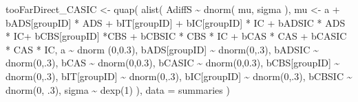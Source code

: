 \documentclass[
  10pt,
  dvipsnames,enabledeprecatedfontcommands]{scrartcl}
\newenvironment{Shaded}{\begin{snugshade}}{\end{snugshade}}
\newcommand{\AttributeTok}[1]{\textcolor[rgb]{0.77,0.63,0.00}{#1}}
\newcommand{\DecValTok}[1]{\textcolor[rgb]{0.00,0.00,0.81}{#1}}
\newcommand{\FloatTok}[1]{\textcolor[rgb]{0.00,0.00,0.81}{#1}}
\newcommand{\FunctionTok}[1]{\textcolor[rgb]{0.00,0.00,0.00}{#1}}
\newcommand{\NormalTok}[1]{#1}
\newcommand{\OtherTok}[1]{\textcolor[rgb]{0.56,0.35,0.01}{#1}}
\newcommand{\SpecialCharTok}[1]{\textcolor[rgb]{0.00,0.00,0.00}{#1}}
\begin{document}
\begin{Shaded}
\begin{Highlighting}[]
\NormalTok{tooFarDirect\_CASIC }\OtherTok{\textless{}{-}} \FunctionTok{quap}\NormalTok{(}
  \FunctionTok{alist}\NormalTok{(}
\NormalTok{    AdiffS }\SpecialCharTok{\textasciitilde{}} \FunctionTok{dnorm}\NormalTok{( mu, sigma ),}
\NormalTok{    mu }\OtherTok{\textless{}{-}}\NormalTok{ a }\SpecialCharTok{+}\NormalTok{ bADS[groupID] }\SpecialCharTok{*}\NormalTok{ ADS }\SpecialCharTok{+}\NormalTok{  bIT[groupID] }\SpecialCharTok{+}\NormalTok{ bIC[groupID] }\SpecialCharTok{*}\NormalTok{ IC }\SpecialCharTok{+} 
\NormalTok{      bADSIC }\SpecialCharTok{*}\NormalTok{ ADS }\SpecialCharTok{*}\NormalTok{ IC}\SpecialCharTok{+}\NormalTok{ bCBS[groupID] }\SpecialCharTok{*}\NormalTok{CBS }\SpecialCharTok{+}\NormalTok{ bCBSIC }\SpecialCharTok{*}\NormalTok{ CBS }\SpecialCharTok{*}\NormalTok{ IC }\SpecialCharTok{+}\NormalTok{ bCAS }\SpecialCharTok{*}\NormalTok{ CAS }\SpecialCharTok{+}\NormalTok{ bCASIC }\SpecialCharTok{*}\NormalTok{ CAS }\SpecialCharTok{*}\NormalTok{ IC, }
\NormalTok{    a }\SpecialCharTok{\textasciitilde{}} \FunctionTok{dnorm}\NormalTok{ (}\DecValTok{0}\NormalTok{,}\FloatTok{0.3}\NormalTok{),}
\NormalTok{    bADS[groupID] }\SpecialCharTok{\textasciitilde{}} \FunctionTok{dnorm}\NormalTok{(}\DecValTok{0}\NormalTok{,.}\DecValTok{3}\NormalTok{),}
\NormalTok{    bADSIC }\SpecialCharTok{\textasciitilde{}} \FunctionTok{dnorm}\NormalTok{(}\DecValTok{0}\NormalTok{,.}\DecValTok{3}\NormalTok{),}
\NormalTok{    bCAS }\SpecialCharTok{\textasciitilde{}} \FunctionTok{dnorm}\NormalTok{(}\DecValTok{0}\NormalTok{,}\FloatTok{0.3}\NormalTok{),}
\NormalTok{    bCASIC }\SpecialCharTok{\textasciitilde{}} \FunctionTok{dnorm}\NormalTok{(}\DecValTok{0}\NormalTok{,}\FloatTok{0.3}\NormalTok{),}
\NormalTok{    bCBS[groupID] }\SpecialCharTok{\textasciitilde{}} \FunctionTok{dnorm}\NormalTok{(}\DecValTok{0}\NormalTok{,.}\DecValTok{3}\NormalTok{),}
\NormalTok{    bIT[groupID] }\SpecialCharTok{\textasciitilde{}} \FunctionTok{dnorm}\NormalTok{(}\DecValTok{0}\NormalTok{,.}\DecValTok{3}\NormalTok{),}
\NormalTok{    bIC[groupID] }\SpecialCharTok{\textasciitilde{}} \FunctionTok{dnorm}\NormalTok{(}\DecValTok{0}\NormalTok{,.}\DecValTok{3}\NormalTok{),}
\NormalTok{    bCBSIC }\SpecialCharTok{\textasciitilde{}} \FunctionTok{dnorm}\NormalTok{(}\DecValTok{0}\NormalTok{, .}\DecValTok{3}\NormalTok{),}
\NormalTok{    sigma  }\SpecialCharTok{\textasciitilde{}} \FunctionTok{dexp}\NormalTok{(}\DecValTok{1}\NormalTok{)}
\NormalTok{  ), }
  \AttributeTok{data =}\NormalTok{ summaries}
\NormalTok{)}



\end{Highlighting}
\end{Shaded}
\end{document}
